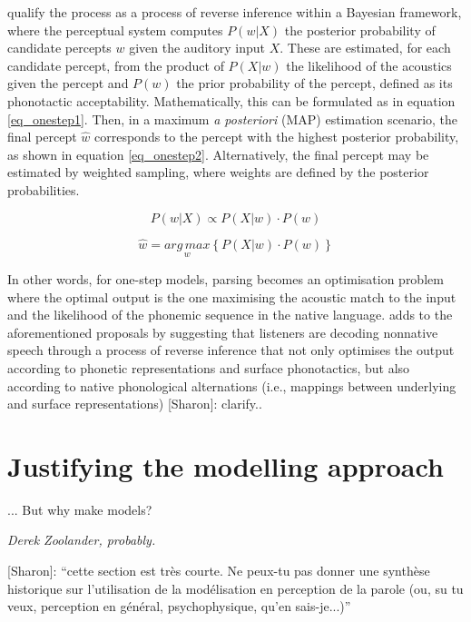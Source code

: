 \cite{wilson2013} qualify the process as a process of reverse inference within a Bayesian framework, where the perceptual system computes $P(w | X)$ the posterior probability of candidate percepts $w$ given the auditory input $X$. These are estimated, for each candidate percept, from the product of $P(X|w)$ the likelihood of the acoustics given the percept and $P(w)$ the prior probability of the percept, defined as its phonotactic acceptability. Mathematically, this can be formulated as in equation \ref{eq_onestep1}. Then, in a maximum \textit{a posteriori} (MAP) estimation scenario, the final percept $\widehat{w}$ corresponds to the percept with the highest posterior probability, as shown in equation \ref{eq_onestep2}. Alternatively, the final percept may be estimated by weighted sampling, where weights are defined by the posterior probabilities.     

\begin{equation}
  P(w | X) \propto P(X | w) \cdot P(w)
  \label{eq_onestep1}
\end{equation}

\begin{equation}
  \widehat{w} = \underset{w}{arg\,max} \left \{ P(X|w) \cdot P(w) \right \}
  \label{eq_onestep2}
\end{equation}

In other words, for one-step models, parsing becomes an optimisation problem where the optimal output is the one maximising the acoustic match to the input and the likelihood of the phonemic sequence in the native language. \cite{durvasula2015} adds to the aforementioned proposals by suggesting that listeners are decoding nonnative speech through a {\color{red}process of reverse inference that not only optimises the output according to phonetic representations and surface phonotactics, but also according to native phonological alternations (i.e., mappings between underlying and surface representations) [Sharon]: clarify.}.

\section{Justifying the modelling approach}
\epigraph{... But why make models?}{\textit{Derek Zoolander, probably.}}

{\color{red}[Sharon]: ``cette section est très courte. Ne peux-tu pas donner une synthèse historique sur l'utilisation de la modélisation en perception de la parole (ou, su tu veux, perception en général, psychophysique, qu'en sais-je...)''}

